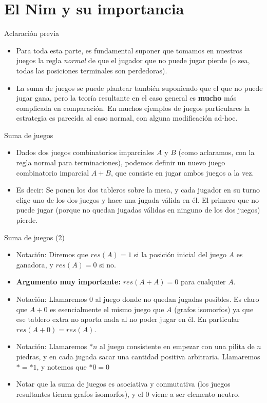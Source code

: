 \documentclass{beamer}
\begin{document}
\section{El Nim y su importancia}

\begin{frame}{Aclaración previa}
    \begin{itemize}
        \item Para toda esta parte, es fundamental suponer que tomamos en nuestros juegos la regla \textit{normal} de que el jugador que no puede jugar pierde
        (o sea, todas las posiciones terminales son perdedoras).
        \item La suma de juegos se puede plantear también suponiendo que el que no puede jugar gana, pero la teoría resultante en el caso general es
         \textbf{mucho} más complicada en comparación. En muchos ejemplos de juegos particulares la estrategia es parecida al caso normal,
         con alguna modificación ad-hoc.
    \end{itemize}
\end{frame}

\begin{frame}{Suma de juegos}
    \begin{itemize}
        \item Dados dos juegos combinatorios imparciales $A$ y $B$ (como aclaramos, con la regla normal para terminaciones), podemos
        definir un nuevo juego combinatorio imparcial $A+B$, que consiste en jugar ambos juegos a la vez.
        \item Es decir: Se ponen los dos tableros sobre la mesa, y cada jugador en su turno elige uno de los dos juegos y hace una
        jugada válida en él. El primero que no puede jugar (porque no quedan jugadas válidas en ninguno de los dos juegos) pierde.
    \end{itemize}
\end{frame}

\begin{frame}{Suma de juegos (2)}
    \begin{itemize}
        \item Notación: Diremos que $res(A) = 1$ si la posición inicial del juego $A$ es ganadora, y $res(A) = 0$ si no.
        \item \textbf{Argumento muy importante:} $res(A+A) = 0$ para cualquier $A$.
        \item Notación: Llamaremos $0$ al juego donde no quedan jugadas posibles. Es claro que $A+0$ es esencialmente el mismo
        juego que $A$ (grafos isomorfos) ya que ese tablero extra no aporta nada al no poder jugar en él. En particular $res(A+0) = res(A)$.
        \item Notación: Llamaremos $*n$ al juego consistente en empezar con una pilita de $n$ piedras, y en cada jugada sacar una cantidad positiva arbitraria. Llamaremos $* = *1$, y notemos que $*0 = 0$
        \item Notar que la suma de juegos es asociativa y conmutativa (los juegos resultantes tienen grafos isomorfos), y el $0$ viene a ser elemento neutro.
    \end{itemize}
\end{frame}
\end{document}
